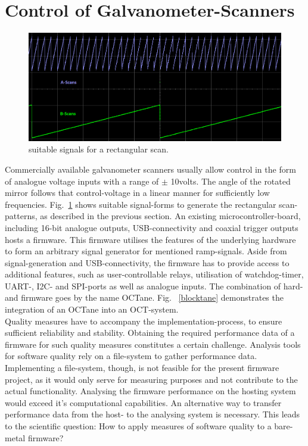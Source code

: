 \section{Control of Galvanometer-Scanners}
\begin{figure}[h!]	\centering	\includegraphics[width=\textwidth]{images/GalvoRamps01.png}	\caption{suitable signals for a rectangular scan.}	\label{GalvoRamps01}	\end{figure}
Commercially available galvanometer scanners usually allow control in the form of analogue voltage inputs with a range of $\pm$ 10volts. The angle of the rotated mirror follows that control-voltage in a linear manner for sufficiently low frequencies. Fig.~\ref{GalvoRamps01} shows suitable signal-forms to generate the rectangular scan-patterns, as described in the previous section. An existing microcontroller-board, including 16-bit analogue outputs, USB-connectivity and coaxial trigger outputs hosts a firmware. This firmware utilises the features of the underlying hardware to form an arbitrary signal generator for mentioned ramp-signals. Aside from signal-generation and USB-connectivity, the firmware has to provide access to additional features, such as user-controllable relays, utilisation of watchdog-timer, UART-, I2C- and SPI-ports as well as analogue inputs. The combination of hard- and firmware goes by the name OCTane. Fig. ~\ref{blocktane} demonstrates the integration of an OCTane into an OCT-system. \\ 
Quality measures have to accompany the implementation-process, to ensure sufficient reliability and stability. Obtaining the required performance data of a firmware for such quality measures constitutes a certain challenge. Analysis tools for software quality rely on a file-system to gather performance data. Implementing a file-system, though, is not feasible for the present firmware project, as it would only serve for measuring purposes and not contribute to the actual functionality. Analysing the firmware performance on the hosting system would exceed it's computational capabilities. An alternative way to transfer performance data from the host- to the analysing system is necessary. This leads to the scientific question: How to apply measures of software quality to a bare-metal firmware?
